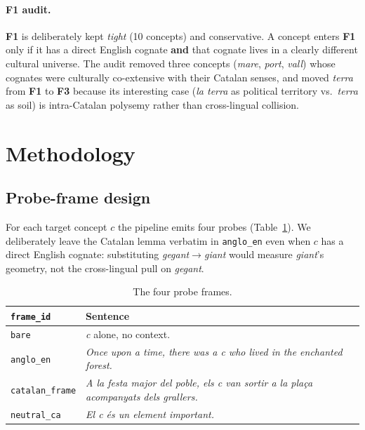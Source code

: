 \documentclass[10pt,twocolumn,a4paper]{article}
\newcommand{\code}[1]{\texttt{\small #1}}
\newcommand{\concept}[1]{\emph{#1}}
\newcommand{\Fone}{\textbf{F1}}
\newcommand{\Fthree}{\textbf{F3}}
\begin{document}
\paragraph{F1 audit.}
\Fone{} is deliberately kept \emph{tight} (10 concepts) and conservative. A
concept enters \Fone{} only if it has a direct English cognate \textbf{and}
that cognate lives in a clearly different cultural universe. The audit removed
three concepts (\concept{mare}, \concept{port}, \concept{vall}) whose cognates
were culturally co-extensive with their Catalan senses, and moved
\concept{terra} from \Fone{} to \Fthree{} because its interesting case
(\emph{la terra} as political territory vs.\ \emph{terra} as soil) is
intra-Catalan polysemy rather than cross-lingual collision.

\section{Methodology}\label{sec:method}

\subsection{Probe-frame design}

For each target concept $c$ the pipeline emits four probes
(Table~\ref{tab:frames}). We deliberately leave the Catalan lemma verbatim in
\code{anglo\_en} even when $c$ has a direct English cognate: substituting
\concept{gegant}$\rightarrow$\emph{giant} would measure \emph{giant}'s
geometry, not the cross-lingual pull on \concept{gegant}.

\begin{table}[t]
  \centering
  \small
  \begin{tabular}{@{}lp{5.5cm}@{}}
    \toprule
    \textbf{\code{frame\_id}} & \textbf{Sentence} \\
    \midrule
    \code{bare}          & \concept{c} alone, no context. \\
    \code{anglo\_en}     & \emph{Once upon a time, there was a c who lived in the enchanted forest.} \\
    \code{catalan\_frame}& \emph{A la festa major del poble, els c van sortir a la plaça acompanyats dels grallers.} \\
    \code{neutral\_ca}   & \emph{El c és un element important.} \\
    \bottomrule
  \end{tabular}
  \caption{The four probe frames.}
  \label{tab:frames}
\end{table}
\end{document}
